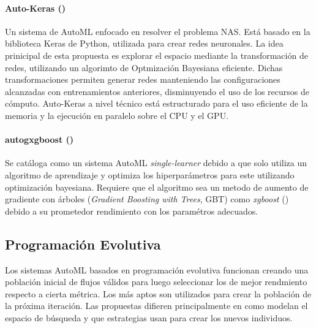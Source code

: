 \paragraph*{Auto-Keras (\cite{jin2018efficient})} Un sistema de AutoML enfocado en resolver el problema NAS. Est\'a basado en la biblioteca Keras de Python, utilizada para crear redes neuronales.  La idea prinicipal de esta propuesta es explorar el espacio mediante la transformaci\'on de redes, utilizando un algorimto de Optmizaci\'on Bayesiana eficiente. Dichas transformaciones permiten generar redes manteniendo las configuraciones alcanzadas con entrenamientos anteriores, disminuyendo el uso de los recursos de c\'omputo. Auto-Keras a nivel t\'ecnico est\'a estructurado para el uso eficiente de la memoria y la ejecuci\'on en paralelo sobre el CPU y el GPU.

\paragraph*{autogxgboost (\cite{thomas2018automatic})} Se cat\'aloga como un sistema AutoML \textit {single-learner} debido a que solo utiliza un algoritmo de aprendizaje y optimiza los hiperpar\'ametros para este utilizando optimizaci\'on bayesiana. Requiere que el algoritmo sea un metodo de aumento de gradiente con \'arboles (\textit{Gradient Boosting with Trees}, GBT) como \textit {xgboost} (\cite{chen2016xgboost}) debido a su prometedor rendimiento con los param\'etros adecuados.   
    
\subsection{Programaci\'on Evolutiva}
     Los sistemas AutoML basados en programaci\'on evolutiva funcionan creando una poblaci\'on inicial de flujos v\'alidos para luego seleccionar los de mejor rendmiento respecto a cierta m\'etrica. Los m\'as aptos son utilizados para crear la poblaci\'on de la pr\'oxima iteraci\'on. Las propuestas difieren principalmente en como modelan el espacio de b\'usqueda y que estrategias usan para crear los nuevos individuos.
     
